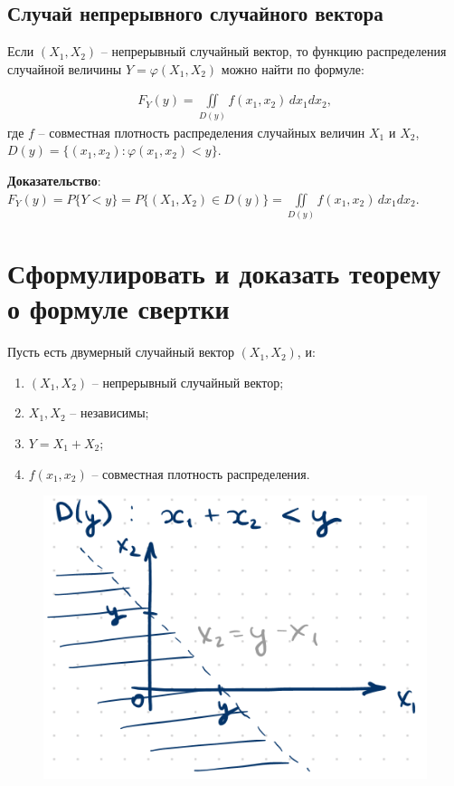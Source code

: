 \subsection*{Случай непрерывного случайного вектора}

Если $(X_1, X_2)$ -- непрерывный случайный вектор, то функцию распределения случайной величины $Y = \varphi(X_1, X_2)$ можно найти по формуле:

\begin{align*}
	F_Y(y) = \iint\limits_{D(y)} f(x_1, x_2) \, dx_1 dx_2,
\end{align*}
где $f$ -- совместная плотность распределения случайных величин $X_1$ и $X_2$, $D(y) = \{(x_1, x_2):\varphi(x_1, x_2)<y\}$.

\textbf{Доказательство}: 
$F_Y(y) = P\{Y < y\} = P\{(X_1, X_2) \in D(y)\} = \iint\limits_{D(y)} f(x_1, x_2) \, dx_1 dx_2$.

\section{Сформулировать и доказать теорему о формуле свертки}

Пусть есть двумерный случайный вектор $(X_1, X_2)$, и:
\begin{enumerate}
	\item $(X_1, X_2)$ -- непрерывный случайный вектор;
	\item $X_1, X_2$ -- независимы;
	\item $Y = X_1 + X_2$;
	\item $f(x_1, x_2)$ -- совместная плотность распределения.
\end{enumerate}

\begin{figure}
	\includegraphics[width=\linewidth]{img/1.png}
\end{figure}  


